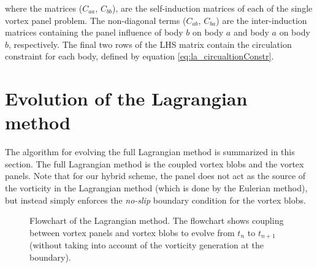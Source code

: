 where the matrices ($C_{aa}$, $C_{bb}$), are the self-induction matrices of each of the single vortex panel problem. The non-diagonal terms ($C_{ab}$, $C_{ba}$) are the inter-induction matrices containing the panel influence of 
body $b$ on body $a$ and body $a$ on body $b$, respectively. The final two rows of the LHS matrix contain the circulation constraint for each body, defined by equation \ref{eq:la_circualtionConstr}.






\section{Evolution of the Lagrangian method}
\label{sec:la-eolm}
The algorithm for evolving the full Lagrangian method is summarized in this section. The full Lagrangian method is the coupled vortex blobs and the vortex panels. Note that for our hybrid scheme, the panel does not act as the source of the vorticity in the Lagrangian method (which is done by the Eulerian method), but instead simply enforces the \emph{no-slip} boundary condition for the vortex blobs.
	
	\begin{figure}[!h]
		\centering
		\caption{Flowchart of the Lagrangian method. The flowchart shows coupling between vortex panels and vortex blobs to evolve from $t_n$ to $t_{n+1}$ (without taking into account of the vorticity generation at the boundary).}
		\label{fig:flowchart_lagrangian}
	\end{figure}	
	
